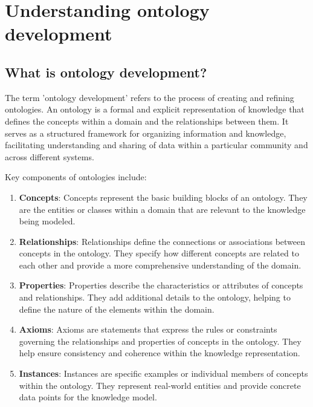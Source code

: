 \section{Understanding ontology development}

\subsection{What is ontology development?}
The term 'ontology development' refers to the process of creating and refining ontologies. An ontology is a formal and explicit representation of knowledge that defines the concepts within a domain and the relationships between them. It serves as a structured framework for organizing information and knowledge, facilitating understanding and sharing of data within a particular community and across different systems.

Key components of ontologies include:

\begin{enumerate}
    \item \textbf{Concepts}: Concepts represent the basic building blocks of an ontology. They are the entities or classes within a domain that are relevant to the knowledge being modeled.

    \item \textbf{Relationships}: Relationships define the connections or associations between concepts in the ontology. They specify how different concepts are related to each other and provide a more comprehensive understanding of the domain.

    \item \textbf{Properties}: Properties describe the characteristics or attributes of concepts and relationships. They add additional details to the ontology, helping to define the nature of the elements within the domain.

    \item \textbf{Axioms}: Axioms are statements that express the rules or constraints governing the relationships and properties of concepts in the ontology. They help ensure consistency and coherence within the knowledge representation.

    \item \textbf{Instances}: Instances are specific examples or individual members of concepts within the ontology. They represent real-world entities and provide concrete data points for the knowledge model.
\end{enumerate}

